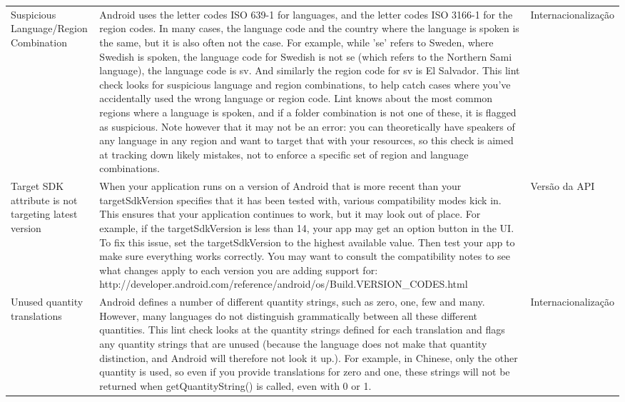 \begin{landscape}
\begin{longtable}{p{30mm}|p{180mm}|p{25mm}}
Suspicious Language/Region Combination
&Android uses the letter codes ISO 639-1 for languages, and the letter codes ISO 3166-1 for the region codes. In many cases, the language code and the country where the language is spoken is the same, but it is also often not the case. For example, while 'se' refers to Sweden, where Swedish is spoken, the language code for Swedish is not se (which refers to the Northern Sami language), the language code is sv. And similarly the region code for sv is El Salvador.  This lint check looks for suspicious language and region combinations, to help catch cases where you've accidentally used the wrong language or region code. Lint knows about the most common regions where a language is spoken, and if a folder combination is not one of these, it is flagged as suspicious.  Note however that it may not be an error: you can theoretically have speakers of any language in any region and want to target that with your resources, so this check is aimed at tracking down likely mistakes, not to enforce a specific set of region and language combinations.
&Internacionalização\\

Target SDK attribute is not targeting latest version
&When your application runs on a version of Android that is more recent than your targetSdkVersion specifies that it has been tested with, various compatibility modes kick in. This ensures that your application continues to work, but it may look out of place. For example, if the targetSdkVersion is less than 14, your app may get an option button in the UI.  To fix this issue, set the targetSdkVersion to the highest available value. Then test your app to make sure everything works correctly. You may want to consult the compatibility notes to see what changes apply to each version you are adding support for: http://developer.android.com/reference/android/os/Build.VERSION\_CODES.html
&Versão da API\\

Unused quantity translations
&Android defines a number of different quantity strings, such as zero, one, few and many. However, many languages do not distinguish grammatically between all these different quantities.  This lint check looks at the quantity strings defined for each translation and flags any quantity strings that are unused (because the language does not make that quantity distinction, and Android will therefore not look it up.). For example, in Chinese, only the other quantity is used, so even if you provide translations for zero and one, these strings will not be returned when getQuantityString() is called, even with 0 or 1.
&Internacionalização\\


\end{longtable}
\end{landscape}
